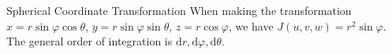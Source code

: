 \begin{proposition}{Spherical Coordinate Transformation}{}
  When making the transformation $x = r\sin \varphi\cos \theta$,
  $y = r\sin \varphi\sin \theta$,
  $z = r \cos \varphi$,
  we have $J(u,v,w) = r^2 \sin \varphi$.
  The general order of integration is $\mathrm{d}r, \mathrm{d} \varphi, \mathrm{d} \theta$.
\end{proposition}







